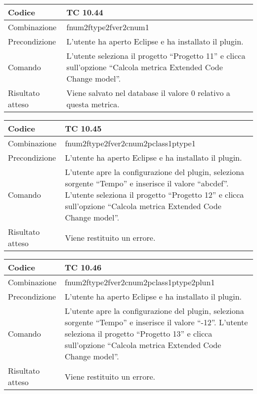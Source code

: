 \begin{table}[ht]
\begin{tabular}{|p{3cm}|p{9cm}|}
\hline
\cellcolor{lightgray}Codice				& TC 10.44								\\
\hline
\cellcolor{lightgray}Combinazione		& fnum2ftype2fver2cnum1									\\
\hline
\cellcolor{lightgray}Precondizione		& L'utente ha aperto Eclipse e ha installato il plugin.		\\
\hline
\cellcolor{lightgray}Comando			& L'utente seleziona il progetto ``Progetto 11''  e clicca sull'opzione ``Calcola metrica Extended Code Change model''.	\\
\hline
\cellcolor{lightgray}Risultato atteso	& Viene salvato nel database il valore 0 relativo a questa metrica.\\
\hline
\end{tabular}
\end{table}

\begin{table}[ht]
\begin{tabular}{|p{3cm}|p{9cm}|}
\hline
\cellcolor{lightgray}Codice				& TC 10.45								\\
\hline
\cellcolor{lightgray}Combinazione		& fnum2ftype2fver2cnum2pclass1ptype1									\\
\hline
\cellcolor{lightgray}Precondizione		& L'utente ha aperto Eclipse e ha installato il plugin.		\\
\hline
\cellcolor{lightgray}Comando			& L'utente apre la configurazione del plugin, seleziona sorgente ``Tempo'' e inserisce il valore ``abcdef''. L'utente seleziona il progetto ``Progetto 12''  e clicca sull'opzione ``Calcola metrica Extended Code Change model''.	\\
\hline
\cellcolor{lightgray}Risultato atteso	& Viene restituito un errore.\\
\hline
\end{tabular}
\end{table}

\begin{table}[ht]
\begin{tabular}{|p{3cm}|p{9cm}|}
\hline
\cellcolor{lightgray}Codice				& TC 10.46								\\
\hline
\cellcolor{lightgray}Combinazione		& fnum2ftype2fver2cnum2pclass1ptype2plun1									\\
\hline
\cellcolor{lightgray}Precondizione		& L'utente ha aperto Eclipse e ha installato il plugin.		\\
\hline
\cellcolor{lightgray}Comando			& L'utente apre la configurazione del plugin, seleziona sorgente ``Tempo'' e inserisce il valore ``-12''. L'utente seleziona il progetto ``Progetto 13''  e clicca sull'opzione ``Calcola metrica Extended Code Change model''.	\\
\hline
\cellcolor{lightgray}Risultato atteso	& Viene restituito un errore.\\
\hline
\end{tabular}
\end{table}


